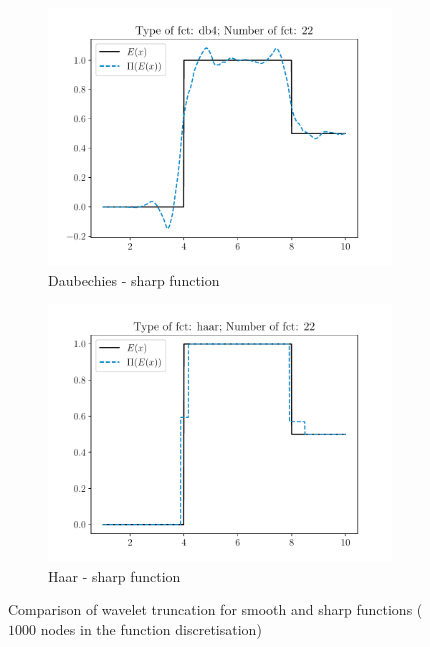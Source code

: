 \begin{figure}[hbpt!]
\begin{subfigure}[t]{0.5\linewidth}
\end{subfigure}  
  \begin{subfigure}[t]{0.5\linewidth}
    \centering
    \includegraphics[width=\linewidth]{Figures/db4_N_22_sharp.pdf}
    \caption{Daubechies - sharp function}
\end{subfigure} 
  \begin{subfigure}[t]{0.5\linewidth}
    \centering
    \includegraphics[width=\linewidth]{Figures/haar_N_22_sharp.pdf}
    \caption{Haar - sharp function}
\end{subfigure} 
\caption{Comparison of wavelet truncation for smooth and sharp functions ($1000$ nodes in the function discretisation)}
    \label{Wavelet_1D}
\end{figure}


